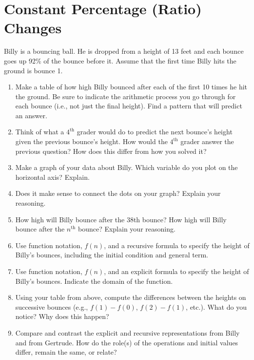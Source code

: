 \newpage
\section{Constant Percentage (Ratio) Changes}\label{A:ConstantRatio}

\begin{prob}
Billy is a bouncing ball.  He is dropped from a height of 13 feet and each bounce goes up 92\% of the bounce before it.  Assume that the first time Billy hits the ground is bounce 1.  

\begin{enumerate}
\item Make a table of how high Billy bounced after each of the first 10 times he hit the ground.  Be sure to indicate the arithmetic process you go through for each bounce (i.e., not just the final height).  Find a pattern that will predict an answer.  

\item Think of what a $4^\mathrm{th}$ grader would do to predict the next bounce's height given the previous bounce's height.  How would the $4^\mathrm{th}$ grader answer the previous question?  How does this differ from how you solved it?

\item Make a graph of your data about Billy.  Which variable do you plot on the horizontal axis?  Explain.  

\item Does it make sense to connect the dots on your graph?  Explain your reasoning.  

\item How high will Billy bounce after the 38th bounce?  How high will Billy bounce after the $n^\mathrm{th}$ bounce?  Explain your reasoning. 

\item  Use function notation, $f(n)$, and a recursive formula to specify the height of Billy's bounces, including the initial condition and general term.   

\item Use function notation, $f(n)$, and an explicit formula to specify the height of Billy's bounces.  Indicate the domain of the function.    

\item Using your table from above, compute the differences between the heights on successive bounces (e.g.,  $f(1) - f(0)$, $f(2) - f(1)$, etc.).  What do you notice?  Why does this happen?

\item Compare and contrast the explicit and recursive representations from Billy and from Gertrude.  How do the role(s) of the operations and initial values differ, remain the same, or relate?
\end{enumerate}
\end{prob}

